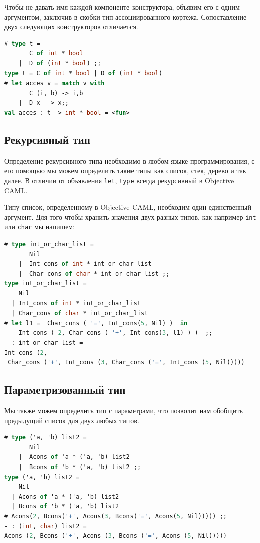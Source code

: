 Чтобы не давать имя каждой компоненте конструктора, объявим его с одним
аргументом, заключив в скобки тип ассоциированного кортежа. Сопоставление двух
следующих конструкторов отличается.

\begin{lstlisting}[language=OCaml]
# type t =
       C of int * bool
    |  D of (int * bool) ;;
type t = C of int * bool | D of (int * bool)
# let acces v = match v with
       C (i, b) -> i,b
    |  D x  -> x;;
val acces : t -> int * bool = <fun>
\end{lstlisting}

\subsection{Рекурсивный тип}

 Определение рекурсивного типа необходимо в любом языке программирования, с его
помощью мы можем определить такие типы как список, стек, дерево и так далее. В
отличии от объявления \texttt{let}, \texttt{type} всегда рекурсивный в Objective
CAML.

Типу список, определенному в Objective CAML, необходим один единственный
аргумент. Для того чтобы хранить значения двух разных типов, как например
\texttt{int} или \texttt{char} мы напишем:

\begin{lstlisting}[language=OCaml]
# type int_or_char_list =
       Nil
    |  Int_cons of int * int_or_char_list
    |  Char_cons of char * int_or_char_list ;;
type int_or_char_list =
    Nil
  | Int_cons of int * int_or_char_list
  | Char_cons of char * int_or_char_list
# let l1 =  Char_cons ( '=', Int_cons(5, Nil) )  in
    Int_cons ( 2, Char_cons ( '+', Int_cons(3, l1) ) )  ;;
- : int_or_char_list =
Int_cons (2,
 Char_cons ('+', Int_cons (3, Char_cons ('=', Int_cons (5, Nil)))))
\end{lstlisting}

\subsection{Параметризованный тип}

Мы также можем определить тип с параметрами, что позволит нам обобщить
предыдущий список для двух любых типов.

\begin{lstlisting}[language=OCaml]
# type ('a, 'b) list2 =
       Nil
    |  Acons of 'a * ('a, 'b) list2
    |  Bcons of 'b * ('a, 'b) list2 ;;
type ('a, 'b) list2 =
    Nil
  | Acons of 'a * ('a, 'b) list2
  | Bcons of 'b * ('a, 'b) list2
# Acons(2, Bcons('+', Acons(3, Bcons('=', Acons(5, Nil))))) ;;
- : (int, char) list2 =
Acons (2, Bcons ('+', Acons (3, Bcons ('=', Acons (5, Nil)))))
\end{lstlisting}

